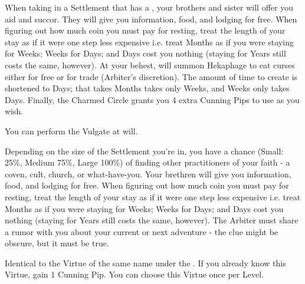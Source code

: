 \begin{multicols*}{2}





When taking  in a Settlement that has a , your brothers and sister will offer you aid and succor. They will give you information, food, and lodging for free. When figuring out how much coin you must pay for resting, treat the length of your stay as if it were one step less expensive i.e. treat Months as if you were staying for Weeks; Weeks for Days; and Days cost you nothing (staying for Years still costs the same, however). At your behest,  will summon Hekaphage to eat curses either for free or for trade (Arbiter's discretion). The amount of time to create  is shortened to Days;  that takes Months takes only Weeks, and Weeks only takes Days. Finally, the Charmed Circle grants you 4 extra Cunning Pips to use as you wish.


You can perform the  Vulgate at will.

\cbreak


Depending on the size of the Settlement you're in, you have a chance (Small: 25\%, Medium 75\%, Large 100\%) of finding other practitioners of your faith - a coven, cult, church, or what-have-you.  Your brethren will give you information, food, and lodging for free. When figuring out how much coin you must pay for resting, treat the length of your stay as if it were one step less expensive i.e. treat Months as if you were staying for Weeks; Weeks for Days; and Days cost you nothing (staying for Years still costs the same, however). The Arbiter must share a rumor with you about your current or next adventure - the clue might be obscure, but it must be true.


Identical to the Virtue of the same name under the . If you already know this Virtue, gain 1 Cunning Pip. You can choose this Virtue once per Level.




\end{multicols*}
